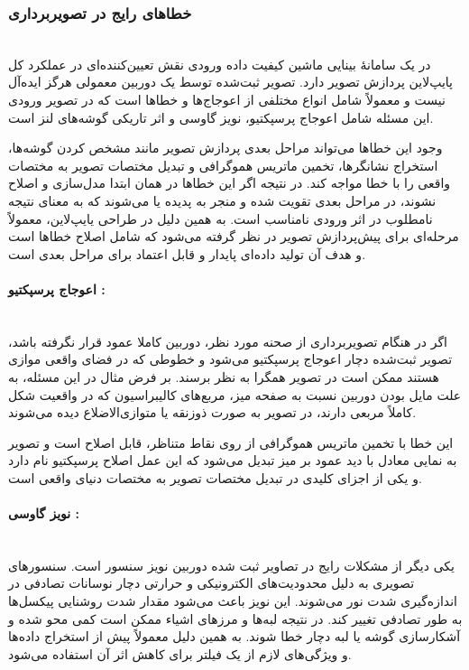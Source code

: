 \documentclass{article}
\begin{document}
\subsubsection*{خطاهای رایج در تصویربرداری}\mbox{}\\

در یک سامانهٔ بینایی ماشین کیفیت داده ورودی نقش تعیین‌کننده‌ای در عملکرد کل پایپ‌لاین پردازش تصویر دارد. تصویر ثبت‌شده توسط یک دوربین معمولی هرگز ایده‌آل نیست و معمولاً شامل انواع مختلفی از اعوجاج‌ها و خطاها است که در تصویر ورودی این مسئله شامل اعوجاج پرسپکتیو، نویز گاوسی و اثر تاریکی گوشه‌های لنز است.

وجود این خطاها می‌تواند مراحل بعدی پردازش تصویر مانند مشخص کردن گوشه‌ها، استخراج نشانگرها، تخمین ماتریس هموگرافی و تبدیل مختصات تصویر به مختصات واقعی را با خطا مواجه کند. در نتیجه اگر این خطاها در همان ابتدا مدل‌سازی و اصلاح نشوند، در مراحل بعدی تقویت شده و منجر به پدیده‌  یا  می‌شوند که به معنای نتیجه نامطلوب در اثر ورودی نامناسب است. به همین دلیل در طراحی یایپ‌لاین، معمولاً مرحله‌ای برای پیش‌پردازش تصویر در نظر گرفته می‌شود که شامل اصلاح خطاها است و هدف آن تولید داده‌ای پایدار و قابل اعتماد برای مراحل بعدی است.

\paragraph{اعوجاج پرسپکتیو :}\mbox{}\\
اگر در هنگام تصویربرداری از صحنه مورد نظر، دوربین کاملا عمود قرار نگرفته باشد، تصویر ثبت‌شده دچار اعوجاج پرسپکتیو می‌شود و خطوطی که در فضای واقعی موازی هستند ممکن است در تصویر همگرا به نظر برسند. بر فرض مثال در این مسئله، به علت مایل بودن دوربین نسبت به صفحه میز، مربع‌های کالیبراسیون که در واقعیت شکل کاملاً مربعی دارند، در تصویر به صورت ذوزنقه یا متوازی‌الاضلاع دیده می‌شوند. 

این خطا با تخمین ماتریس هموگرافی از روی نقاط متناظر، قابل اصلاح است و تصویر به نمایی معادل با دید عمود بر میز تبدیل می‌شود که این عمل اصلاح پرسپکتیو  نام دارد و یکی از اجزای کلیدی در تبدیل مختصات تصویر به مختصات دنیای واقعی است.

\paragraph{ نویز گاوسی :}\mbox{}\\
یکی دیگر از مشکلات رایج در تصاویر ثبت شده دوربین نویز سنسور است. سنسورهای تصویری به دلیل محدودیت‌های الکترونیکی و حرارتی دچار نوسانات تصادفی در اندازه‌گیری شدت نور می‌شوند. این نویز باعث می‌شود مقدار شدت روشنایی پیکسل‌ها به طور تصادفی تغییر کند. در نتیجه لبه‌ها و مرزهای اشیاء ممکن است کمی محو شده و آشکارسازی گوشه یا لبه دچار خطا شوند. به همین دلیل معمولاً پیش از استخراج داده‌ها و ویژگی‌های لازم از یک فیلتر برای کاهش اثر آن استفاده می‌شود. 
\end{document}
